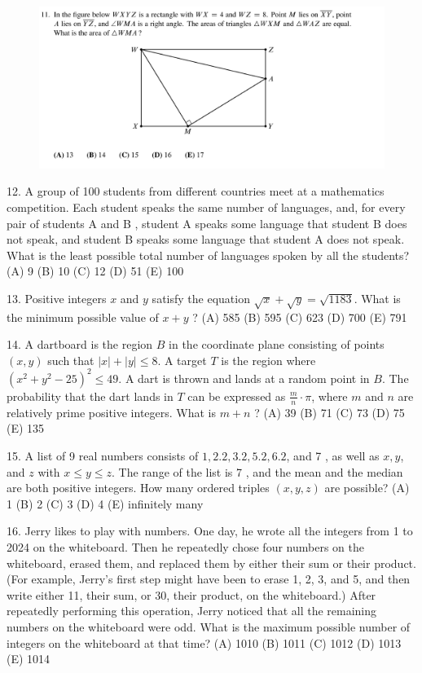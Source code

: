 \documentclass[12pt,a4paper]{book}
\theoremstyle{definition}
\begin{document}
\begin{figure}[H]
    \includegraphics[height=0.3\textheight]{11.png}
\end{figure}
12. A group of 100 students from different countries meet at a mathematics competition. Each student speaks the same number of languages, and, for every pair of students A and B , student A speaks some language that student B does not speak, and student B speaks some language that student A does not speak. What is the least possible total number of languages spoken by all the students?
(A) 9
(B) 10
(C) 12
(D) 51
(E) 100

13. Positive integers $x$ and $y$ satisfy the equation $\sqrt{x}+\sqrt{y}=\sqrt{1183}$. What is the minimum possible value of $x+y$ ?
(A) 585
(B) 595
(C) 623
(D) 700
(E) 791

14. A dartboard is the region $B$ in the coordinate plane consisting of points $(x, y)$ such that $|x|+|y| \leq 8$. A target $T$ is the region where $\left(x^2+y^2-25\right)^2 \leq 49$. A dart is thrown and lands at a random point in $B$. The probability that the dart lands in $T$ can be expressed as $\frac{m}{n} \cdot \pi$, where $m$ and $n$ are relatively prime positive integers. What is $m+n$ ?
(A) 39
(B) 71
(C) 73
(D) 75
(E) 135

15. A list of 9 real numbers consists of $1,2.2,3.2,5.2,6.2$, and 7 , as well as $x, y$, and $z$ with $x \leq y \leq z$. The range of the list is 7 , and the mean and the median are both positive integers. How many ordered triples $(x, y, z)$ are possible?
(A) 1
(B) 2
(C) 3
(D) 4
(E) infinitely many

16. Jerry likes to play with numbers. One day, he wrote all the integers from 1 to 2024 on the whiteboard. Then he repeatedly chose four numbers on the whiteboard, erased them, and replaced them by either their sum or their product. (For example, Jerry's first step might have been to erase 1, 2, 3, and 5, and then write either 11, their sum, or 30, their product, on the whiteboard.) After repeatedly performing this operation, Jerry noticed that all the remaining numbers on the whiteboard were odd. What is the maximum possible number of integers on the whiteboard at that time?
(A) 1010
(B) 1011
(C) 1012
(D) 1013
(E) 1014
\end{document}

